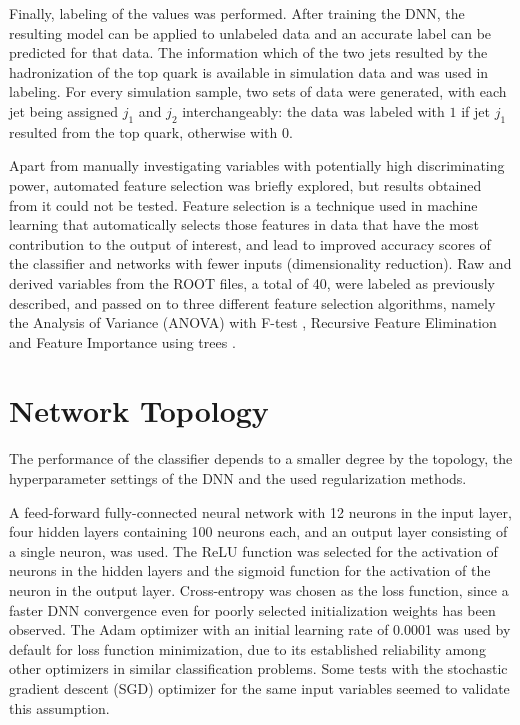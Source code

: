 Finally, labeling of the values was performed. After training the DNN, the resulting model can be applied to unlabeled data and an accurate label can be predicted for that data. The information which of the two jets resulted by the hadronization of the top quark is available in simulation data and was used in labeling. For every simulation sample, two sets of data were generated, with each jet being assigned $j_1$ and $j_2$ interchangeably: the data was labeled with $1$ if jet $j_1$ resulted from the top quark, otherwise with $0$.

Apart from manually investigating variables with potentially high discriminating power, automated feature selection was briefly explored, but results obtained from it could not be tested. Feature selection is a technique used in machine learning that automatically selects those features in data that have the most contribution to the output of interest, and lead to improved accuracy scores of the classifier and networks with fewer inputs (dimensionality reduction). Raw and derived variables from the ROOT files, a total of 40, were labeled as previously described, and passed on to three different feature selection algorithms, namely the Analysis of Variance (ANOVA) with F-test \cite{misc:anova}, Recursive Feature Elimination \cite{scikit-learn} and Feature Importance using trees \cite{scikit-learn}.

\section{Network Topology}
\label{sec:ch-5-network}

The performance of the classifier depends to a smaller degree by the topology, the hyperparameter settings of the DNN and the used regularization methods.

A feed-forward fully-connected neural network with 12 neurons in the input layer, four hidden layers containing 100 neurons each, and an output layer consisting of a single neuron, was used. The ReLU function was selected for the activation of neurons in the hidden layers and the sigmoid function for the activation of the neuron in the output layer. Cross-entropy was chosen as the loss function, since a faster DNN convergence even for poorly selected initialization weights has been observed. The Adam optimizer with an initial learning rate of 0.0001 was used by default for loss function minimization, due to its established reliability among other optimizers in similar classification problems. Some tests with the stochastic gradient descent (SGD) optimizer for the same input variables seemed to validate this assumption.

